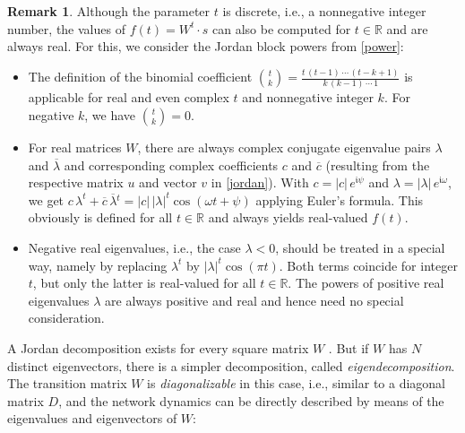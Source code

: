 \documentclass[preprint,12pt,times,authoryear]{elsarticle}%
\theoremstyle{definition}
\newtheorem{remk}{Remark}
\begin{document}
\begin{remk}\label{general}
Although the parameter $t$ is discrete, i.e., a nonnegative integer number, the
values of $f(t) = W^t \cdot s$ can also be computed for $t \in \mathbb{R}$ and
are always real. For this, we consider the Jordan block powers from \cref{power}:
\begin{itemize}
  \item The definition of the binomial coefficient $\binom{t}{k} =
	\frac{t\,(t-1)\,\cdots\,(t-k+1)}{k\,(k-1)\,\cdots\,1}$ is applicable for
	real and even complex $t$ and nonnegative integer $k$. For negative $k$,
	we have $\binom{t}{k} = 0$.
  \item For real matrices $W$, there are always complex conjugate eigenvalue
	pairs $\lambda$ and $\overline{\lambda}$ and corresponding complex
	coefficients $c$ and $\overline{c}$ (resulting from the respective matrix $u$ and vector $v$ in
	\cref{jordan}). With $c = |c|\,e^{\mathfrak{i}\psi}$ and
	$\lambda = |\lambda|\,e^{\mathfrak{i}\omega}$, we get $c\,\lambda^t +
	\overline{c}\,\overline{\lambda}{}^t = |c|\,|\lambda|^t \cos(\omega
	t+\psi)$ applying Euler's formula. This obviously is defined for all
	$t \in \mathbb{R}$ and always yields real-valued $f(t)$.
  \item Negative real eigenvalues, i.e., the case $\lambda<0$, should be treated
	in a special way, namely by replacing $\lambda^t$ by $|\lambda|^t \cos(\pi t)$.
	Both terms coincide for integer $t$, but only the latter is real-valued
	for all $t \in \mathbb{R}$. The powers of positive real eigenvalues
	$\lambda$ are always positive and real and hence need no special consideration.
\end{itemize}
\end{remk}

A Jordan decomposition exists for every square matrix $W$ \citep[Theorem~3.1.11]{HJ13}.
But if $W$ has $N$ distinct eigenvectors, there is a simpler decomposition,
called \emph{eigendecomposition}. The transition matrix $W$ is
\emph{diagonalizable} in this case, i.e., similar to a diagonal matrix $D$, and
the network dynamics can be directly described by means of the eigenvalues and
eigenvectors of $W$:
\end{document}
